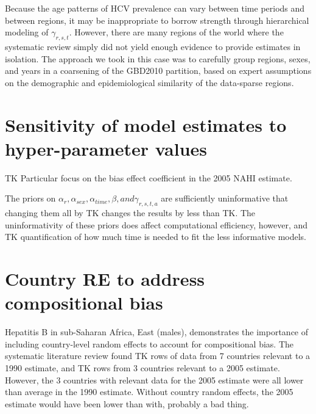 Because the age patterns of HCV prevalence can vary between time
periods and between regions, it may be inappropriate to borrow
strength through hierarchical modeling of $\gamma_{r,s,t}$.  However,
there are many regions of the world where the systematic review simply
did not yield enough evidence to provide estimates in isolation.  The
approach we took in this case was to carefully group regions, sexes,
and years in a coarsening of the GBD2010 partition, based on expert
assumptions on the demographic and epidemiological similarity of the
data-sparse regions.

\section{Sensitivity of model estimates to hyper-parameter values}

TK Particular focus on the bias effect coefficient in the 2005 NAHI
estimate.

The priors on $\alpha_{r}, \alpha_{sex}, \alpha_{time}, \beta, and
\gamma_{r,s,t,a}$ are sufficiently uninformative that changing them
all by TK changes the results by less than TK.  The uninformativity of
these priors does affect computational efficiency, however, and TK
quantification of how much time is needed to fit the less informative
models.

\section{Country RE to address compositional bias}
Hepatitis B in sub-Saharan Africa, East (males), demonstrates the
importance of including country-level random effects to account for
compositional bias.  The systematic literature review found TK rows of
data from 7 countries relevant to a 1990 estimate, and TK rows from 3
countries relevant to a 2005 estimate.  However, the 3 countries with
relevant data for the 2005 estimate were all lower than average in the
1990 estimate.  Without country random effects, the 2005 estimate
would have been lower than with, probably a bad thing.
